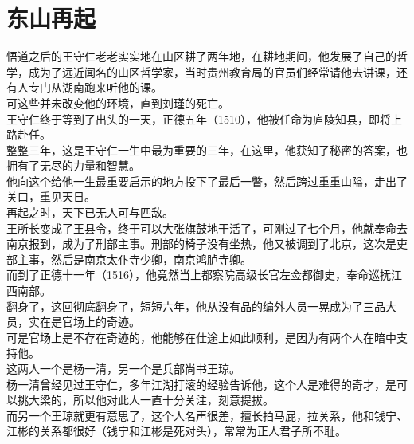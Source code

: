\section{东山再起}
\ifnum{}
	\begin{multicols}{\theparacolNo}
\fi
悟道之后的王守仁老老实实地在山区耕了两年地，在耕地期间，他发展了自己的哲学，成为了远近闻名的山区哲学家，当时贵州教育局的官员们经常请他去讲课，还有人专门从湖南跑来听他的课。\\

可这些并未改变他的环境，直到刘瑾的死亡。\\

王守仁终于等到了出头的一天，正德五年（1510），他被任命为庐陵知县，即将上路赴任。\\

整整三年，这是王守仁一生中最为重要的三年，在这里，他获知了秘密的答案，也拥有了无尽的力量和智慧。\\

他向这个给他一生最重要启示的地方投下了最后一瞥，然后跨过重重山隘，走出了关口，重见天日。\\

再起之时，天下已无人可与匹敌。\\

王所长变成了王县令，终于可以大张旗鼓地干活了，可刚过了七个月，他就奉命去南京报到，成为了刑部主事。刑部的椅子没有坐热，他又被调到了北京，这次是吏部主事，然后是南京太仆寺少卿，南京鸿胪寺卿。\\

而到了正德十一年（1516），他竟然当上都察院高级长官左佥都御史，奉命巡抚江西南部。\\

翻身了，这回彻底翻身了，短短六年，他从没有品的编外人员一晃成为了三品大员，实在是官场上的奇迹。\\

可是官场上是不存在奇迹的，他能够在仕途上如此顺利，是因为有两个人在暗中支持他。\\

这两人一个是杨一清，另一个是兵部尚书王琼。\\

杨一清曾经见过王守仁，多年江湖打滚的经验告诉他，这个人是难得的奇才，是可以挑大梁的，所以他对此人一直十分关注，刻意提拔。\\

而另一个王琼就更有意思了，这个人名声很差，擅长拍马屁，拉关系，他和钱宁、江彬的关系都很好（钱宁和江彬是死对头），常常为正人君子所不耻。\\


\end{multicols}
